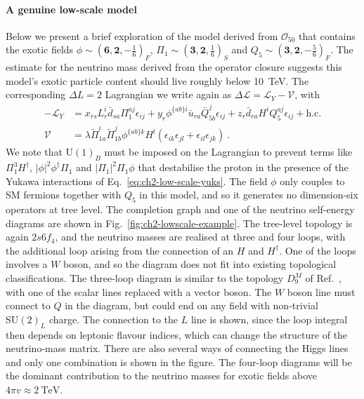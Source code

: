\paragraph{A genuine low-scale model} Below we present a brief exploration of
the model derived from $\mathcal{O}_{50}$ that contains the exotic fields
$\phi \sim (\mathbf{6}, \mathbf{2}, -\tfrac{1}{6})_{F}$,
$\Pi_{1} \sim (\mathbf{3}, \mathbf{2}, \tfrac{1}{6})_{S}$ and
$Q_{5} \sim (\mathbf{3}, \mathbf{2}, -\tfrac{5}{6})_{F}$. The estimate for the
neutrino mass derived from the operator closure suggests this model's exotic
particle content should live roughly below \SI{10}{\TeV}. The corresponding
$\Delta L = 2$ Lagrangian we write again as
$\Delta \mathscr{L} = \mathscr{L}_{Y} - \mathcal{V}$, with
\begin{align}
  -\mathscr{L}_{Y} &= x_{rs} L^{i}_{r} \bar{d}_{sa} \Pi_{1}^{aj} \epsilon_{ij} + y_{r} \phi^{\{ab\}i} \bar{u}_{ra} \bar{Q}^{j}_{5 b} \epsilon_{ij} + z_{r} \bar{d}_{ra} H^{i} Q^{aj}_{5} \epsilon_{ij} + \text{h.c.} \label{eq:ch2-low-scale-yuks} \\
  \mathcal{V} &= \lambda \tilde{\Pi}_{1a}^{i} \tilde{\Pi}_{1b}^{j} \phi^{\{ab\}k} H^{l} (\epsilon_{ik}\epsilon_{jl} + \epsilon_{il}\epsilon_{jk}) \ .
\end{align}
We note that $\mathrm{U}(1)_{B}$ must be imposed on the Lagrangian to prevent
terms like $\Pi^{3}_{1} H^{\dagger}$, $|\phi|^{2}\phi^{\dagger}\Pi_{1}$ and
$|\Pi_{1}|^{2} \Pi_{1} \phi$ that destabilise the proton in the presence of the
Yukawa interactions of Eq.~\eqref{eq:ch2-low-scale-yuks}. The field $\phi$ only
couples to SM fermions together with $Q_{5}$ in this model, and so it generates
no dimension-six operators at tree level. The completion graph and one of the
neutrino self-energy diagrams are shown in Fig.~\ref{fig:ch2-lowscale-example}. The
tree-level topology is again $2s6f_{4}$, and the neutrino masses are realised at
three and four loops, with the additional loop arising from the connection of an
$H$ and $H^{\dagger}$. One of the loops involves a $W$ boson, and so the diagram
does not fit into existing topological classifications. The three-loop diagram
is similar to the topology $D_{9}^{M}$ of Ref.~\cite{Cepedello:2018rfh}, with
one of the scalar lines replaced with a vector boson. The $W$ boson line must
connect to $Q$ in the diagram, but could end on any field with non-trivial
$\mathrm{SU}(2)_{L}$ charge. The connection to the $L$ line is shown, since the
loop integral then depends on leptonic flavour indices, which can change the
structure of the neutrino-mass matrix. There are also several ways of connecting
the Higgs lines and only one combination is shown in the figure. The four-loop
diagrams will be the dominant contribution to the neutrino masses for exotic
fields above $4 \pi v \approx \SI{2}{\TeV}$.

